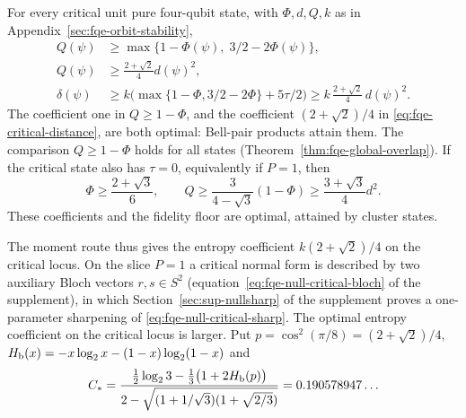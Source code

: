 \begin{theorem}
\label{thm:fqe-critical-orbit-sharp}
For every critical unit pure four-qubit state, with $\Phi,d,Q,k$
as in Appendix~\ref{sec:fqe-orbit-stability},
\begin{align}
 Q(\psi)&\ge\max\{1-\Phi(\psi),\;3/2-2\Phi(\psi)\},
                 \label{eq:fqe-critical-fidelity}\\
 Q(\psi)&\ge\frac{2+\sqrt2}{4}d(\psi)^2,
                 \label{eq:fqe-critical-distance}\\
 \delta(\psi)&\ge k\bigl(\max\{1-\Phi,3/2-2\Phi\}+5\tau/2\bigr)
       \ge k\,\frac{2+\sqrt2}{4}\,d(\psi)^2.
                 \label{eq:fqe-critical-entropy}
\end{align}
The coefficient one in $Q\ge1-\Phi$, and the coefficient
$(2+\sqrt2)/4$ in \eqref{eq:fqe-critical-distance}, are both optimal:
Bell-pair products attain them. The comparison $Q\ge1-\Phi$ holds for all states
(Theorem~\ref{thm:fqe-global-overlap}).
If the critical state also has $\tau=0$, equivalently if $P=1$, then
\begin{equation}\label{eq:fqe-null-critical-sharp}
 \Phi\ge\frac{2+\sqrt3}{6},\qquad
 Q\ge\frac3{4-\sqrt3}(1-\Phi)\ge\frac{3+\sqrt3}{4}d^2.
\end{equation}
These coefficients and the fidelity floor are optimal, attained by cluster states.
\end{theorem}

\noindent The moment route thus gives the entropy coefficient $k(2+\sqrt2)/4$ on the critical locus. On the slice $P=1$ a critical normal form is described by two auxiliary Bloch vectors
$r,s\in S^2$ (equation~\eqref{eq:fqe-null-critical-bloch} of the supplement), in which Section~\ref{sec:sup-nullsharp} of the
supplement proves a one-parameter sharpening of \eqref{eq:fqe-null-critical-sharp}. The optimal entropy coefficient
on the critical locus is larger. Put $p=\cos^2(\pi/8)=(2+\sqrt2)/4$, $H_{\rm b}(x)=-x\log_2x-(1-x)\log_2(1-x)$ and
\begin{equation}\label{eq:fqe-p1-cstar}
 C_*=\frac{\tfrac12\log_23-\tfrac13\bigl(1+2H_{\rm b}(p)\bigr)}
          {2-\sqrt{(1+1/\sqrt3)(1+\sqrt{2/3})}}
    =0.190578947\ldots
\end{equation}

